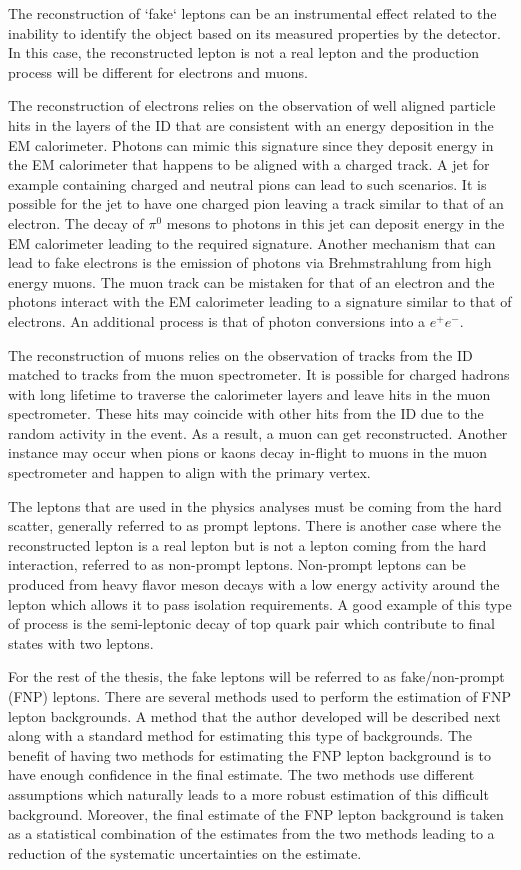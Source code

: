 The reconstruction of `fake` leptons can be an instrumental effect related to the inability to identify the object based on 
its measured properties by the detector. In this case, the reconstructed lepton is not a real lepton and the production process 
will be different for electrons and muons.

The reconstruction of electrons relies on the observation of well aligned particle hits in the layers of the ID that are consistent 
with an energy deposition in the EM calorimeter. Photons can mimic this signature since they deposit energy in the EM 
calorimeter that happens to be aligned with a charged track. A jet for example containing charged and neutral pions can 
lead to such scenarios. It is possible for the jet to have one charged pion leaving a track similar to that of an electron.
The decay of $\pi^0$ mesons to photons in this jet can deposit energy in the EM calorimeter leading to the required signature.
Another mechanism that can lead to fake electrons is the emission of photons via Brehmstrahlung from high energy muons. 
The muon track can be mistaken for that of an electron and the photons interact with the EM calorimeter leading to a
signature similar to that of electrons. An additional process is that of photon conversions into a $e^+e^-$.

The reconstruction of muons relies on the observation of tracks from the ID matched to tracks from the muon spectrometer.
It is possible for charged hadrons with long lifetime to traverse the calorimeter layers and leave hits in the muon spectrometer.
These hits may coincide with other hits from the ID due to the random activity in the event. As a result, a muon can get
reconstructed. Another instance may occur when pions or kaons decay in-flight to muons in the muon spectrometer
and happen to align with the primary vertex.

The leptons that are used in the physics analyses must be coming from the hard scatter, generally referred to as prompt leptons.
There is another case where the reconstructed lepton is a real lepton but is not a lepton coming from the hard interaction,
referred to as non-prompt leptons. Non-prompt leptons can be produced from heavy flavor meson decays with a low energy activity 
around the lepton which allows it to pass isolation requirements. A good example of this type of process is the 
semi-leptonic decay of top quark pair which contribute to final states with two leptons. 

For the rest of the thesis, the fake leptons will be referred to as fake/non-prompt (FNP) leptons.
There are several methods used to perform the estimation of FNP lepton backgrounds. 
A method that the author developed will be described next along with a standard method for estimating this type of backgrounds.
The benefit of having two methods for estimating the FNP lepton background is to have enough confidence in the final estimate. 
The two methods use different assumptions which naturally leads to a more robust estimation of this difficult background.
Moreover, the final estimate of the FNP lepton background is taken as a statistical combination of the estimates from the 
two methods leading to a reduction of the systematic uncertainties on the estimate.
